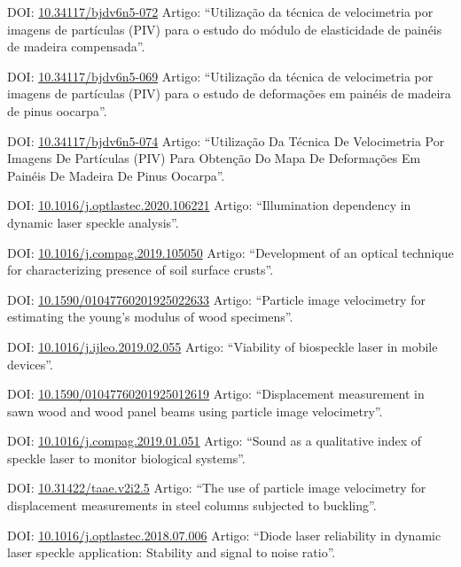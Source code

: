 \documentclass[11pt,a4paper,sans]{moderncv} %
\newcommand{\doiurl}[1]{\href{https://doi.org/#1}{#1}}
\begin{document}
	      {DOI: \doiurl{10.34117/bjdv6n5-072}}{}{}
	      {Artigo: ``Utilização da técnica de velocimetria por imagens de partículas (PIV) para o estudo do módulo de elasticidade de painéis de madeira compensada''.}

	      {DOI: \doiurl{10.34117/bjdv6n5-069}}{}{}
	      {Artigo: ``Utilização da técnica de velocimetria por imagens de partículas (PIV) para o estudo de deformações em painéis de madeira de pinus oocarpa''.}


	      {DOI: \doiurl{10.34117/bjdv6n5-074}}{}{}
	      {Artigo: ``Utilização Da Técnica De Velocimetria Por Imagens De Partículas (PIV) Para Obtenção Do Mapa De Deformações Em Painéis De Madeira De Pinus Oocarpa''.}

	      {DOI: \doiurl{10.1016/j.optlastec.2020.106221}}{}{}
	      {Artigo: ``Illumination dependency in dynamic laser speckle analysis''.}


	      {DOI: \doiurl{10.1016/j.compag.2019.105050}}{}{}
	      {Artigo: ``Development of an optical technique for characterizing presence of soil surface crusts''.}


	      {DOI: \doiurl{10.1590/01047760201925022633}}{}{}
	      {Artigo: ``Particle image velocimetry for estimating the young’s modulus of wood specimens''.}

	      {DOI: \doiurl{10.1016/j.ijleo.2019.02.055}}{}{}
	      {Artigo: ``Viability of biospeckle laser in mobile devices''.}

	      {DOI: \doiurl{10.1590/01047760201925012619}}{}{}
	      {Artigo: ``Displacement measurement in sawn wood and wood panel beams using particle image velocimetry''.}

	      {DOI: \doiurl{10.1016/j.compag.2019.01.051}}{}{}
	      {Artigo: ``Sound as a qualitative index of speckle laser to monitor biological systems''.}

	      {DOI: \doiurl{10.31422/taae.v2i2.5}}{}{}
	      {Artigo: ``The use of particle image velocimetry for displacement measurements in steel columns subjected to buckling''.}
	      
	      {DOI: \doiurl{10.1016/j.optlastec.2018.07.006}}{}{}
	      {Artigo: ``Diode laser reliability in dynamic laser speckle application: Stability and signal to noise ratio''.}
	      
\end{document}
